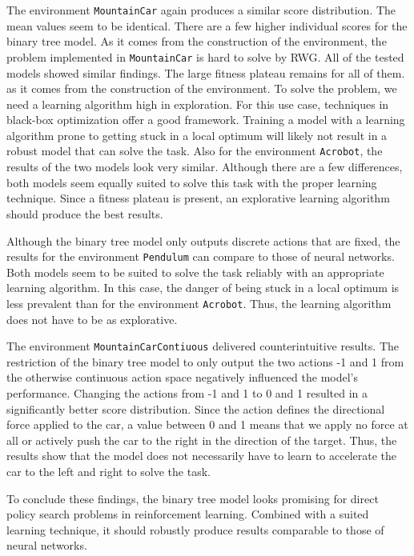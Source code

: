 The environment \verb|MountainCar| again produces a similar score distribution. The mean values seem to be identical. There are a few higher individual scores for the binary tree model. As it comes from the construction of the environment, the problem implemented in \verb|MountainCar| is hard to solve by RWG. All of the tested models showed similar findings. The large fitness plateau remains for all of them. as it comes from the construction of the environment. To solve the problem, we need a learning algorithm high in exploration. For this use case, techniques in black-box optimization offer a good framework. Training a model with a learning algorithm prone to getting stuck in a local optimum will likely not result in a robust model that can solve the task. Also for the environment \verb|Acrobot|, the results of the two models look very similar. Although there are a few differences, both models seem equally suited to solve this task with the proper learning technique. Since a fitness plateau is present, an explorative learning algorithm should produce the best results.

Although the binary tree model only outputs discrete actions that are fixed, the results for the environment \verb|Pendulum| can compare to those of neural networks. Both models seem to be suited to solve the task reliably with an appropriate learning algorithm. In this case, the danger of being stuck in a local optimum is less prevalent than for the environment \verb|Acrobot|. Thus, the learning algorithm does not have to be as explorative.

The environment \verb|MountainCarContiuous| delivered counterintuitive results. The restriction of the binary tree model to only output the two actions -1 and 1 from the otherwise continuous action space negatively influenced the model's performance. Changing the actions from -1 and 1 to 0 and 1 resulted in a significantly better score distribution. Since the action defines the directional force applied to the car, a value between 0 and 1 means that we apply no force at all or actively push the car to the right in the direction of the target. Thus, the results show that the model does not necessarily have to learn to accelerate the car to the left and right to solve the task.

To conclude these findings, the binary tree model looks promising for direct policy search problems in reinforcement learning. Combined with a suited learning technique, it should robustly produce results comparable to those of neural networks.

